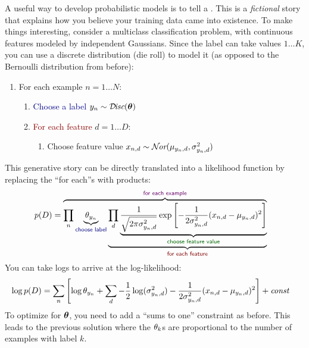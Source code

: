A useful way to develop probabilistic models is to tell a
.  This is a \emph{fictional} story that
explains how you believe your training data came into existence.  To
make things interesting, consider a multiclass classification problem,
with continuous features modeled by independent Gaussians.  Since the
label can take values $1 \dots K$, you can use a discrete
distribution (die roll) to model it (as opposed to the Bernoulli
distribution from before):
%
\begin{enumerate}
  \item \textcolor{darkpurple}{For each example} $n = 1 \dots N$:
    \begin{enumerate}
      \item \textcolor{darkblue}{Choose a label} $y_n \sim \mathcal{D}\hspace{-0.5mm}\textit{isc}(\boldsymbol{\theta})$
      \item \textcolor{darkred}{For each feature} $d = 1 \dots D$:
        \begin{enumerate}
          \item \textcolor{darkergreen}{Choose feature value} $x_{n,d} \sim \mathcal{N}\hspace{-0.5mm}\textit{or}(\mu_{y_n,d}, \sigma^2_{y_n,d})$
         \end{enumerate}
     \end{enumerate}
\end{enumerate}
%
This generative story can be directly translated into a likelihood
function by replacing the ``for each''s with products:
%
\begin{align}
  p(D)
  &=  \overbrace{
      \prod_n
       \underbrace{\th_{y_n}}_{\textsf{\textcolor{darkblue}{choose label}}}
       \underbrace{
       \prod_d
         \underbrace{\frac 1 {\sqrt{2 \pi \si_{y_n,d}^2}}
         \exp\left[
           -\frac 1 {2 \si_{y_n,d}^2} (x_{n,d} - \mu_{y_n,d})^2
           \right]}_{\textsf{\textcolor{darkergreen}{choose feature value}}}
         }_{\textsf{\textcolor{darkred}{for each feature}}}}
       ^{\textsf{\textcolor{darkpurple}{for each example}}}
\end{align}
%
You can take logs to arrive at the log-likelihood:
%
\begin{align}
\log p(D)
&=
\sum_n
  \left[
    \log \theta_{y_n} +
    \sum_d
      -\frac 1 2 \log(\sigma_{y_n,d}^2)
      -\frac 1 {2 \sigma_{y_n,d}^2} (x_{n,d} - \mu_{y_n,d})^2
      \right]
  + \textit{const}
\end{align}
%
To optimize for $\boldsymbol{\theta}$, you need to add a ``sums to one''
constraint as before.  This leads to the previous solution where the
$\theta_k$s are proportional to the number of examples with label $k$.
